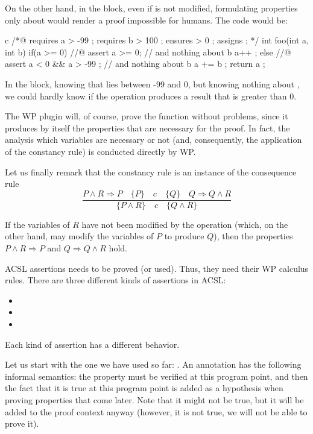 On the other hand, in the  block, even if  is
not modified, formulating properties only about  would render
a proof impossible for humans. The code would be:



\begin{CodeBlock}{c}
/*@
  requires a > -99 ;
  requires b > 100 ;
  ensures  \result > 0 ;
  assigns  \nothing ;
*/
int foo(int a, int b){
  if(a >= 0){
    //@ assert a >= 0; // and nothing about b
    a++ ;
  } else {
    //@ assert a < 0 && a > -99 ; // and nothing about b
    a += b ;
  }
  return a ;
}
\end{CodeBlock}



In the  block, knowing that lies between -99 and
0, but knowing nothing about , we could hardly know if the
operation  produces a result that is greater than 0.

The WP plugin will, of course, prove the function without problems,
since it produces by itself the properties that are necessary for the
proof. In fact, the analysis which variables are necessary or not (and,
consequently, the application of the constancy rule) is conducted
directly by WP.

Let us finally remark that the constancy rule is an instance of the
consequence rule
$$\dfrac{P \wedge R \Rightarrow P \quad \{P\}\quad c\quad \{Q\} \quad Q \Rightarrow Q \wedge R}{\{P \wedge R\}\quad c\quad \{Q \wedge R\}}$$


If the variables of $R$ have not been modified by the operation
(which, on the other hand, may modify the variables of $P$ to produce
$Q$), then the properties $P \wedge R \Rightarrow P$ and
$Q \Rightarrow Q \wedge R$ hold.




ACSL assertions needs to be proved (or used). Thus, they need their WP calculus
rules. There are three different kinds of assertions in ACSL:
\begin{itemize}
  \item {}
  \item {}
  \item {}
\end{itemize}


Each kind of assertion has a different behavior.


Let us start with the one we have used so far: . An
annotation  has the following informal semantics: the
property  must be verified at this program point, and then the
fact that it is true at this program point is added as a hypothesis when proving
properties that come later. Note that it might not be true, but it will be added
to the proof context anyway (however, it is not true, we will not be able to
prove it).


